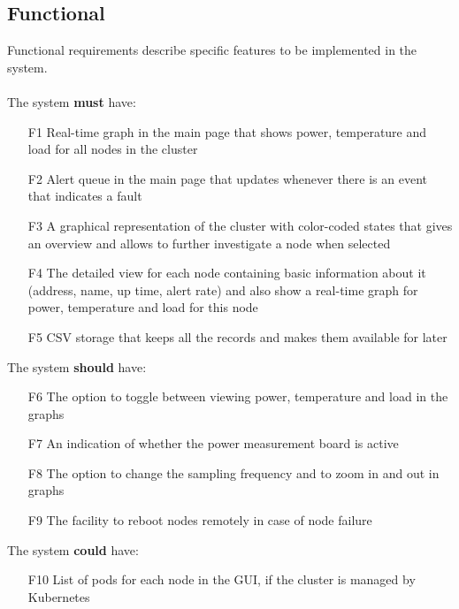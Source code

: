 \documentclass{l4proj}
\begin{document}
\subsection{Functional}
\label{functional}
Functional requirements describe specific features to be implemented in the system. \\\\
\noindent
The system \textbf{must} have:
\begin{enumerate}
\item [F1] Real-time graph in the main page that shows power, temperature and load for all nodes in the cluster
\item [F2] Alert queue in the main page that updates whenever there is an event that indicates a fault
\item [F3] A graphical representation of the cluster with color-coded states that gives an overview and allows to further investigate a node when selected
\item [F4] The detailed view for each node containing basic information about it (address, name, up time, alert rate) and also show a real-time graph for power, temperature and load for this node
\item [F5] CSV storage that keeps all the records and makes them available for later
\end{enumerate}
The system \textbf{should} have:
\begin{enumerate}
\item [F6] The option to toggle between viewing power, temperature and load in the graphs
\item [F7] An indication of whether the power measurement board is active
\item [F8] The option to change the sampling frequency and to zoom in and out in graphs
\item [F9] The facility to reboot nodes remotely in case of node failure
\end{enumerate}
The system \textbf{could} have:
\begin{enumerate}
\item [F10] List of pods for each node in the GUI, if the cluster is managed by Kubernetes
\end{enumerate}
\end{document}
